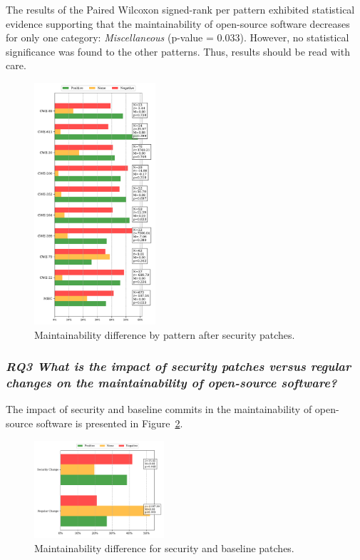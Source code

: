 \documentclass[10pt,conference]{IEEEtran}
\begin{document}
The results of the
Paired Wilcoxon signed-rank per pattern exhibited statistical
evidence supporting that the maintainability of open-source software decreases for
only one category: \emph{Miscellaneous} (p-value = $0.033$). However, no statistical
significance was found to the other patterns. Thus, results should be read with care. 





\begin{figure}[h]
 	\centering
 	\includegraphics[width=0.4\textwidth]{figures/maintainability_cwe.pdf}
 	\caption{Maintainability difference by pattern after security patches.}
	\label{fig:pat}	
\end{figure}

\subsubsection*{\textit{\textbf{RQ3} \textbf{What is the impact of security patches versus regular changes on the
maintainability of open-source software?}}}

The impact of security and baseline commits in the maintainability of
open-source software is presented in Figure~\ref{fig:secvsreg}.  

\begin{figure}[h]	
 	\centering 	\includegraphics[width=0.43\textwidth]{figures/maintainability_sec_vs_reg.pdf}
 	\caption{Maintainability difference for security and baseline patches.}
	\label{fig:secvsreg}
\end{figure}
\end{document}
